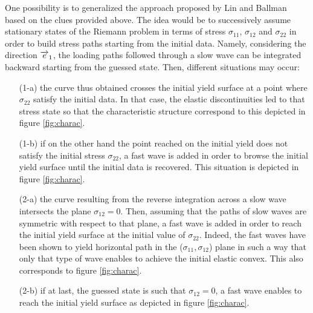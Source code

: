 One possibility is to generalized the approach proposed by Lin and Ballman \cite{Lin_et_Ballman} based on the clues provided above.
The idea would be to successively assume stationary states of the Riemann problem in terms of stress $\sigma_{11}$, $\sigma_{12}$ and $\sigma_{22}$ in order to build stress paths starting from the initial data.
Namely, considering the direction ${\overrightarrow{e}}_1$, the loading paths followed through a slow wave can be integrated backward starting from the guessed state.
Then, different situations may occur:
\begin{itemize}
\item[(1-a)] the curve thus obtained crosses the initial yield surface at a point where $\sigma_{22}$ satisfy the initial data.
  In that case, the elastic discontinuities led to that stress state so that the characteristic structure correspond to this depicted in figure \ref{fig:charac}.
\item[(1-b)] if on the other hand the point reached on the initial yield does not satisfy the initial stress $\sigma_{22}$, a fast wave is added in order to browse the initial yield surface until the initial data is recovered.
  This situation is depicted in figure \ref{fig:charac}.
\item[(2-a)] the curve resulting from the reverse integration across a slow wave intersects the plane $\sigma_{12}=0$.
  Then, assuming that the paths of slow waves are symmetric with respect to that plane, a fast wave is added in order to reach the initial yield surface at the initial value of $\sigma_{22}$.
  Indeed, the fast waves have been shown to yield horizontal path in the ($\sigma_{11},\sigma_{12}$) plane in such a way that only that type of wave enables to achieve the initial elastic convex.
  This also corresponds to figure \ref{fig:charac}.
\item[(2-b)] if at last, the guessed state is such that $\sigma_{12}=0$, a fast wave enables to reach the initial yield surface as depicted in figure \ref{fig:charac}.
\end{itemize}

